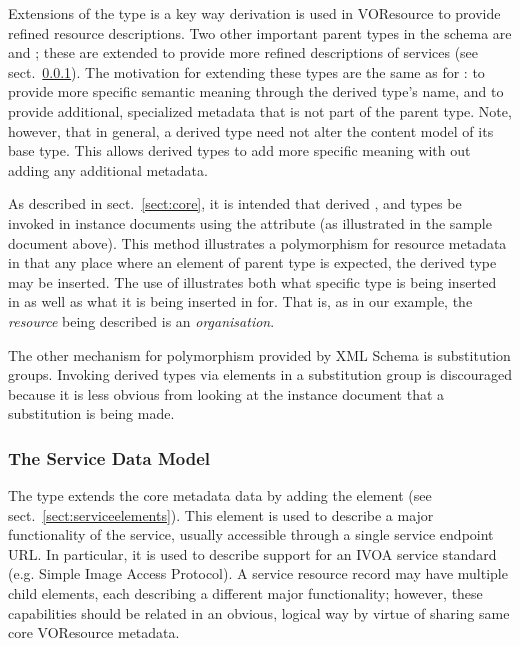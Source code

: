 \documentclass[11pt,a4paper]{ivoa}
\begin{document}
Extensions of the  type is a key way
derivation is used in VOResource to provide refined resource
descriptions.  Two other important parent types in the schema are
 and ; these are
extended to provide more refined descriptions of services (see
sect.~\ref{sect:servicemodel}).  The motivation for extending
these types are the same as for : to provide
more specific semantic meaning through the derived type's name, and to
provide additional, specialized metadata that is not part of the
parent type.  Note, however, that in general, a derived type need not
alter the content model of its base type.  This allows derived types
to add more specific meaning with out adding any additional metadata.



As described in sect.~\ref{sect:core}, it is intended that derived
,  and 
types be invoked in instance documents using the 
attribute (as illustrated in the sample document above).  This method
illustrates a polymorphism for resource metadata in that any place where
an element of parent type is expected, the derived type may be inserted.
The use of  illustrates both what specific type is being
inserted in as well as what it is being inserted in for.  That is, as in
our example, the \emph{resource} being described is an
\emph{organisation}.  



The other mechanism for polymorphism provided by XML Schema is
substitution groups.  Invoking derived  types via
elements in a substitution group is discouraged because it is less
obvious from looking at the instance document that a substitution is
being made.  


\subsubsection{The Service Data Model}
\label{sect:servicemodel}


The  type extends the core 
metadata data by adding the  element (see
sect.~\ref{sect:serviceelements}).  This element is used to describe a major
functionality of the service, usually accessible through a single
service endpoint URL.  In particular, it is used to describe support for
an IVOA service standard (e.g. Simple Image Access Protocol).  A service
resource record may have multiple child  elements,
each describing a different major functionality; however, these
capabilities should be related in an obvious, logical way by virtue of
sharing same core VOResource metadata.  
\end{document}
